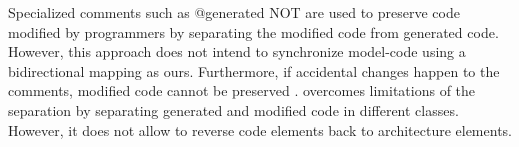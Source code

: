 \noindent
{}
Specialized comments \cite{steinberg2008emf} such as \textsf{@generated NOT} are used to preserve code modified by programmers by separating the modified code from generated code. 
However, this approach does not intend to synchronize model-code using a bidirectional mapping as ours.
Furthermore, if accidental changes happen to the comments, modified code cannot be preserved \cite{zheng2012enhancing}.
 \cite{zheng2012enhancing} overcomes limitations of the separation by separating generated and modified code in different classes.
However, %
it does not allow to reverse code elements back to architecture elements.  




 


